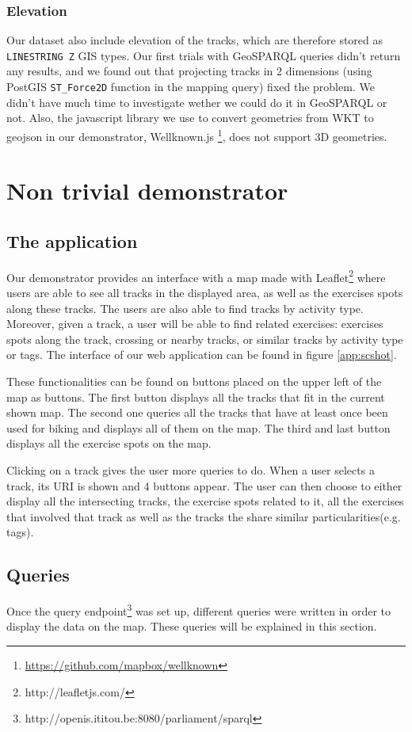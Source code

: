 \documentclass[11pt,a4paper]{scrreprt}
\begin{document}
\subsection{Elevation}
Our dataset also include elevation of the tracks, which are therefore stored as \texttt{LINESTRING Z} GIS types. Our first trials with GeoSPARQL queries didn't return any results, and we found out that projecting tracks in 2 dimensions (using PostGIS \texttt{ST\_Force2D} function in the mapping query) fixed the problem. We didn't have much time to investigate wether we could do it in GeoSPARQL or not. Also, the javascript library we use to convert geometries from WKT to geojson in our demonstrator, Wellknown.js \footnote{\url{https://github.com/mapbox/wellknown}}, does not support 3D geometries.

\chapter{Non trivial demonstrator}
\section{The application}
Our demonstrator provides an interface with a map made with Leaflet\footnote{http://leafletjs.com/} where users are able to see all tracks in the displayed area, as well as the exercises spots along these tracks. The users are also able to find tracks by activity type. Moreover, given a track, a user will be able to find related exercises: exercises spots along the track, crossing or nearby tracks, or similar tracks by activity type or tags. The interface of our web application can be found in figure \ref{app:scshot}.

These functionalities can be found on buttons placed on the upper left of the map as buttons. The first button displays all the tracks that fit in the current shown map. The second one queries all the tracks that have at least once been used for biking and displays all of them on the map. The third and last button displays all the exercise spots on the map.

Clicking on a track gives the user more queries to do. When a user selects a track, its URI is shown and 4 buttons appear. The user can then choose to either display all the intersecting tracks, the exercise spots related to it, all the exercises that involved that track as well as the tracks the share similar particularities(e.g. tags). 

\section{Queries}
Once the query endpoint\footnote{http://openis.ititou.be:8080/parliament/sparql} was set up, different queries were written in order to display the data on the map. These queries will be explained in this section. 
\end{document}
